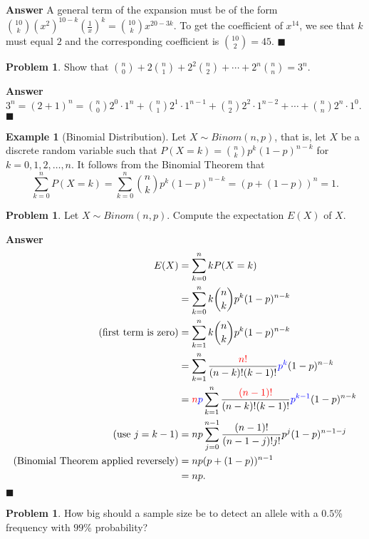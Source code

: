 \documentclass[12pt,letterpaper]{book}
\def\red{\textcolor{red}}
\def\blue{\textcolor{blue}}
\numberwithin{equation}{section}
\theoremstyle{definition}
\newtheorem{problem}[thm]{\textbf{Problem}}
\newtheorem{example}[thm]{\textbf{Example}}
\newenvironment{answer}{\noindent\textbf{Answer}}{\hfill$\blacksquare$\vspace{0.1in}}
\begin{document}
\begin{answer}
A general term of the expansion must be of the form ${10\choose k} (x^2)^{10-k}\left(\frac{1}{x}\right)^k={10\choose k} x^{20-3k}$. To get the coefficient of $x^{14}$, we see that $k$ must equal $2$ and the corresponding coefficient is ${10\choose 2}=45$.
\end{answer}

\begin{problem} Show that
${n \choose 0}+2{n \choose 1}+2^2{n \choose 2}+\cdots+2^n{n \choose n}=3^n$.
\end{problem}

\begin{answer}
$3^n=(2+1)^n={n \choose 0}2^0\cdot1^n+{n \choose 1}2^1\cdot1^{n-1}+{n \choose 2}2^2\cdot1^{n-2}+\cdots+{n \choose n}2^n\cdot 1^0$.
\end{answer}

\begin{example}[Binomial Distribution] Let $X\sim Binom(n,p)$, that is, let $X$ be a discrete random variable such that $P(X=k)={n\choose k}p^k(1-p)^{n-k}$ for $k=0,1,2,\ldots,n$. It follows from the Binomial Theorem that
$$\sum_{k=0}^n P(X=k)=\sum_{k=0}^n {n\choose k}p^k(1-p)^{n-k}=(p+(1-p))^n=1.$$
\end{example}

\begin{problem} Let $X\sim Binom(n,p)$. Compute the expectation $E(X)$ of $X$.
\end{problem}

\begin{answer}
\begin{align*}E(X)&=\sum_{k=0}^n kP(X=k)\\
&=\sum_{k=0}^n k{n\choose k}p^k(1-p)^{n-k}\\
(\text{first term is zero})&=\sum_{k=1}^n k{n\choose k}p^k(1-p)^{n-k}\\
&=\sum_{k=1}^n \frac{\red{n!}}{(n-k)!(k-1)!}\blue{p^k}(1-p)^{n-k}\\
&=\red{n}\blue{p}\sum_{k=1}^n \frac{\red{(n-1)!}}{(n-k)!(k-1)!}\blue{p^{k-1}}(1-p)^{n-k}\\
(\text{use }j=k-1)&=np\sum_{j=0}^{n-1} \frac{(n-1)!}{(n-1-j)!j!}p^{j}(1-p)^{n-1-j}\\
(\text{Binomial Theorem applied reversely})&=np(p+(1-p))^{n-1}\\
&=np.
\end{align*}
\end{answer}

\begin{problem}\label{allelefreq}
How big should a sample size be to detect an allele with a $0.5$\% frequency with $99$\% probability?
\end{problem}
\end{document}
